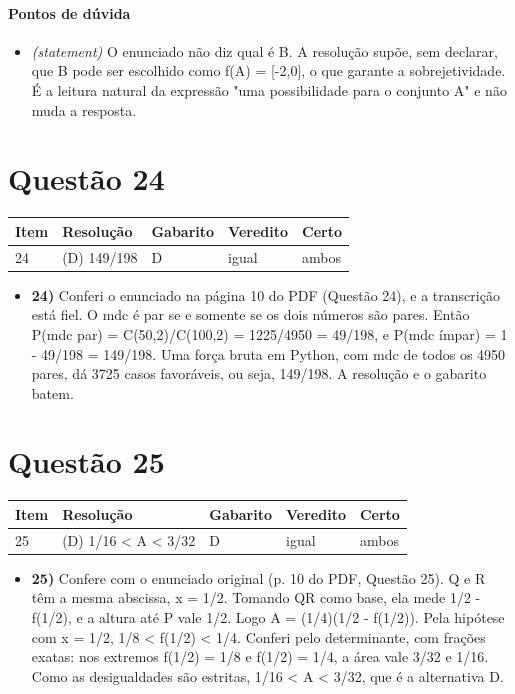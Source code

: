 \documentclass{article}%
\begin{document}
\paragraph{Pontos de dúvida}%
\begin{itemize}%
\item%
\textit{(statement)} O enunciado não diz qual é B. A resolução supõe, sem declarar, que B pode ser escolhido como f(A) = {[}-2,0{]}, o que garante a sobrejetividade. É a leitura natural da expressão "uma possibilidade para o conjunto A" e não muda a resposta.%
\end{itemize}%
\section*{Questão 24}%
\begin{longtable}{@{}p{} p{} p{} p{} p{}@{}}\toprule Item & Resolução & Gabarito & Veredito & Certo \\ \midrule
24 & (D) 149/198 & D & igual & ambos \\
\bottomrule\end{longtable}%
\begin{itemize}%
\item%
\textbf{24)} Conferi o enunciado na página 10 do PDF (Questão 24), e a transcrição está fiel. O mdc é par se e somente se os dois números são pares. Então P(mdc par) = C(50,2)/C(100,2) = 1225/4950 = 49/198, e P(mdc ímpar) = 1 - 49/198 = 149/198. Uma força bruta em Python, com mdc de todos os 4950 pares, dá 3725 casos favoráveis, ou seja, 149/198. A resolução e o gabarito batem.%
\end{itemize}%
\section*{Questão 25}%
\begin{longtable}{@{}p{} p{} p{} p{} p{}@{}}\toprule Item & Resolução & Gabarito & Veredito & Certo \\ \midrule
25 & (D) 1/16 < A < 3/32 & D & igual & ambos \\
\bottomrule\end{longtable}%
\begin{itemize}%
\item%
\textbf{25)} Confere com o enunciado original (p. 10 do PDF, Questão 25). Q e R têm a mesma abscissa, x = 1/2. Tomando QR como base, ela mede 1/2 - f(1/2), e a altura até P vale 1/2. Logo A = (1/4)(1/2 - f(1/2)). Pela hipótese com x = 1/2, 1/8 < f(1/2) < 1/4. Conferi pelo determinante, com frações exatas: nos extremos f(1/2) = 1/8 e f(1/2) = 1/4, a área vale 3/32 e 1/16. Como as desigualdades são estritas, 1/16 < A < 3/32, que é a alternativa D.%
\end{itemize}%
\end{document}
